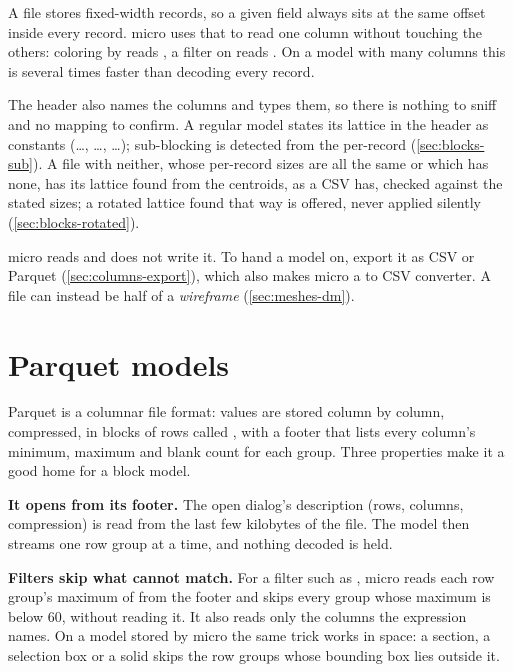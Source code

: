 A  file stores fixed-width records, so a given field always sits at the same offset inside every record. micro uses that to read one column without touching the others: coloring by  reads , a filter on  reads . On a model with many columns this is several times faster than decoding every record.

The header also names the columns and types them, so there is nothing to sniff and no mapping to confirm. A regular model states its lattice in the header as constants (…, …, …); sub-blocking is detected from the per-record    (\cref{sec:blocks-sub}). A file with neither, whose per-record sizes are all the same or which has none, has its lattice found from the centroids, as a CSV has, checked against the stated sizes; a rotated lattice found that way is offered, never applied silently (\cref{sec:blocks-rotated}).

micro reads  and does not write it. To hand a model on, export it as CSV or Parquet (\cref{sec:columns-export}), which also makes micro a  to CSV converter. A  file can instead be half of a \emph{wireframe} (\cref{sec:meshes-dm}).

\section{Parquet models}\label{sec:blocks-parquet}

Parquet is a columnar file format: values are stored column by column, compressed, in blocks of rows called , with a footer that lists every column's minimum, maximum and blank count for each group. Three properties make it a good home for a block model.

\textbf{It opens from its footer.} The open dialog's description (rows, columns, compression) is read from the last few kilobytes of the file. The model then streams one row group at a time, and nothing decoded is held.

\textbf{Filters skip what cannot match.} For a filter such as , micro reads each row group's maximum of  from the footer and skips every group whose maximum is below 60, without reading it. It also reads only the columns the expression names. On a model stored by micro the same trick works in space: a section, a selection box or a solid skips the row groups whose bounding box lies outside it.

